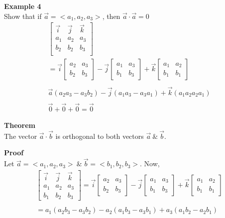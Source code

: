 \documentclass{article}
\begin{document}
  \textbf{Example 4}\\
  Show that if $ \vec{a} = <a_1, a_2, a_3> $, then $ \vec{a} \cdot \vec{a} =0 $
  \[
    \begin{gathered}
    \begin{bmatrix}
      \vec{i} &\vec{j} &\vec{k}\\
      a_{1} &a_{2} &a_{3}\\
      b_{2} &b_{2} &b_{3}\\ 
    \end{bmatrix}\\
    = \vec{ i } \begin{bmatrix}
      a_2 &a_3\\
      b_2 &b_3
    \end{bmatrix} - 
    \vec{ j } \begin{bmatrix}
      a_1 &a_3\\
      b_1 &b_3
    \end{bmatrix} + 
    \vec{ k } \begin{bmatrix}
      a_1 &a_2\\
      b_1 &b_1
    \end{bmatrix}\\
    ~\\
    \vec{a}(a_{2} a_{3} -a_{3} b_{2} )-\vec{j}(a_{1} a_{3} -a_{3} a_{1} )+ \vec{k}(a_{1} a_{2} a_{2} a_{1} )\\
    ~\\
    \vec{0}+\vec{0}+\vec{0}=\boxed{\vec{0}} 
    \end{gathered}
  \] 
  

  \textbf{Theorem}\\
  The vector $ \vec{ a } \cdot \vec{ b }   $ is orthogonal to both vectors $ \vec{ a } ~ \&~ \vec{ b }   $. 

  \textbf{Proof}\\
  Let $ \vec{ a } = < a_1, a_2, a_3> ~ \&~ \vec{ b } = < b_1, b_2, b_3>    $. Now,
  \[
    \begin{gathered}
    \begin{bmatrix}
      \vec{ i } & \vec{ j } & \vec{ k }\\
      a_1 &a_2 &a_3\\
      b_1 &b_2 &b_3
    \end{bmatrix}
    = \vec{ i } \begin{bmatrix}
      a_2 &a_3\\
      b_2 &b_3
    \end{bmatrix} - 
    \vec{ j } \begin{bmatrix}
      a_1 &a_3\\
      b_1 &b_3
    \end{bmatrix} + 
    \vec{ k } \begin{bmatrix}
      a_1 &a_2\\
      b_1 &b_1
    \end{bmatrix}\\
    ~\\
     = a_{1}  (a_2b_3-a_3b_2) - a_{2}  (a_1b_3 - a_3b_1) + a_{3} (a_1b_2 - a_2b_{1})
    \end{gathered}
  \]
\end{document}
